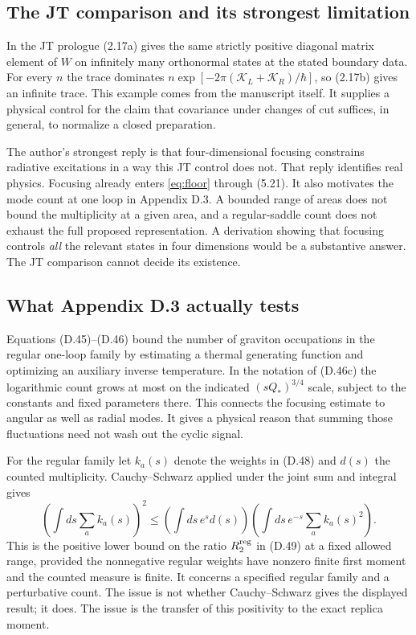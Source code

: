 \documentclass[11pt]{article}
\begin{document}
\subsection{The JT comparison and its strongest limitation}
In the JT prologue (2.17a) gives the same strictly positive diagonal matrix element of $W$ on infinitely many orthonormal states at the stated boundary data. For every $n$ the trace dominates $n\exp[-2\pi(\mathcal K_L+\mathcal K_R)/\hbar]$, so (2.17b) gives an infinite trace. This example comes from the manuscript itself. It supplies a physical control for the claim that covariance under changes of cut suffices, in general, to normalize a closed preparation.

The author's strongest reply is that four-dimensional focusing constrains radiative excitations in a way this JT control does not. That reply identifies real physics. Focusing already enters \eqref{eq:floor} through (5.21). It also motivates the mode count at one loop in Appendix D.3. A bounded range of areas does not bound the multiplicity at a given area, and a regular-saddle count does not exhaust the full proposed representation. A derivation showing that focusing controls \emph{all} the relevant states in four dimensions would be a substantive answer. The JT comparison cannot decide its existence.

\subsection{What Appendix D.3 actually tests}
Equations (D.45)--(D.46) bound the number of graviton occupations in the regular one-loop family by estimating a thermal generating function and optimizing an auxiliary inverse temperature. In the notation of (D.46c) the logarithmic count grows at most on the indicated $(sQ_*)^{3/4}$ scale, subject to the constants and fixed parameters there. This connects the focusing estimate to angular as well as radial modes. It gives a physical reason that summing those fluctuations need not wash out the cyclic signal.

For the regular family let $k_a(s)$ denote the weights in (D.48) and $d(s)$ the counted multiplicity. Cauchy--Schwarz applied under the joint sum and integral gives
\[
 \left(\int ds\sum_a k_a(s)\right)^2
 \le \left(\int ds\, e^s d(s)\right)
     \left(\int ds\,e^{-s}\sum_a k_a(s)^2\right).
\]
This is the positive lower bound on the ratio $R_2^{\rm reg}$ in (D.49) at a fixed allowed range, provided the nonnegative regular weights have nonzero finite first moment and the counted measure is finite. It concerns a specified regular family and a perturbative count. The issue is not whether Cauchy--Schwarz gives the displayed result; it does. The issue is the transfer of this positivity to the exact replica moment.
\end{document}
